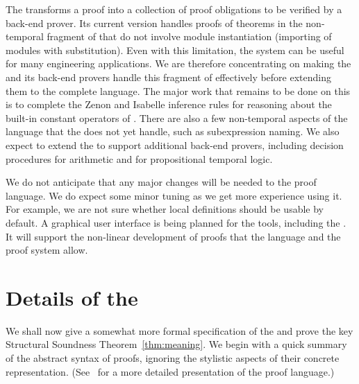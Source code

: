 \documentclass[a4paper]{easychair}
\begin{document}
The \PM transforms a proof into a collection of proof obligations to
be verified by a back-end prover.  Its current version handles proofs
of theorems in the non-temporal fragment of \tlaplus that do not
involve module instantiation (importing of modules with substitution).
Even with this limitation, the system can be useful for many
engineering applications.  We are therefore concentrating on making
the \PM and its back-end provers handle this fragment of \tlaplus
effectively before extending them to the complete language.  The major
work that remains to be done on this is to complete the Zenon and
Isabelle inference rules for reasoning about the built-in constant
operators of \tlaplus.  There are also a few non-temporal aspects of
the \tlatwo language that the \PM does not yet handle, such as
subexpression naming.  We also expect to extend the \PM to support
additional back-end provers, including decision procedures for
arithmetic and for propositional temporal logic.

We do not anticipate that any major changes will be needed to the
\tlatwo proof language.  We do expect some minor tuning as we get more
experience using it. For example, we are not sure whether local
definitions should be usable by default.  A graphical user interface
is being planned for the \tlaplus tools, including the \PM. It will
support the non-linear development of proofs that the language and the
proof system allow.




\appendix

\section{Details of the \PM}
\label{apx}

We shall now give a somewhat more formal specification of the \PM and
prove the key Structural Soundness Theorem~\ref{thm:meaning}.  We
begin with a quick summary of the abstract syntax of \tlatwo proofs,
ignoring the stylistic aspects of their concrete
representation. (See~\cite{lamport08tla+2} for a more detailed
presentation of the proof language.)
\end{document}
